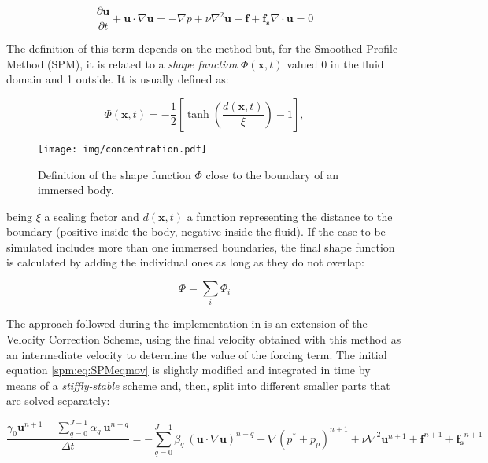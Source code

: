\begin{subequations}
\begin{equation} \label{spm:eq:SPMeqmov}
    \frac{\partial\mathbf{u}}{\partial t} + \mathbf{u}\cdot\nabla\mathbf{u} =
        -\nabla p + \nu\nabla^2\mathbf{u} + \mathbf{f} + \mathbf{f_s}
\end{equation}
\begin{equation}
    \nabla\cdot\mathbf{u} = 0
\end{equation}
\end{subequations}

The definition of this term depends on the method but, for the Smoothed Profile
Method (SPM), it is related to a \emph{shape function} $\Phi(\mathbf{x}, t)$
valued 0 in the fluid domain and 1 outside. It is usually defined as:

\begin{equation} \label{spm:eq:mask}
    \Phi(\mathbf{x},t) = -\frac{1}{2} \left[ \tanh\left(\frac{d(\mathbf{x},t)}
        {\xi}\right)-1 \right],
\end{equation}

\begin{figure}[!htbp]
    \centering
    \texttt{[image: img/concentration.pdf]}
    \caption{Definition of the shape function $\Phi$ close to the boundary of
        an immersed body.}
    \label{spm:fig:shapefunc}
\end{figure}

being $\xi$ a scaling factor \cite{WangSPM} and $d(\mathbf{x}, t)$ a function
representing the distance to the boundary (positive inside the body, negative
inside the fluid). If the case to be simulated includes more than one immersed
boundaries, the final shape function is calculated by adding the individual
ones as long as they do not overlap:

\begin{equation}
    \Phi = \sum_i \Phi_i
\end{equation}

The approach followed during the implementation in \nekpp is an extension of
the Velocity Correction Scheme, using the final velocity obtained with this
method as an intermediate velocity to determine the value of the forcing term.
The initial equation \eqref{spm:eq:SPMeqmov} is slightly modified and
integrated in time by means of a \emph{stiffly-stable} scheme and, then,
split into different smaller parts that are solved separately:

\begin{equation}
     \frac{\gamma_0\mathbf{u}^{n+1}-\sum_{q=0}^{J-1}\alpha_q~\mathbf{u}^{n-q}}
        {\Delta t} = -\sum_{q=0}^{J-1}\beta_q~(\mathbf{u}\cdot
        \nabla\mathbf{u})^{n-q} -\nabla (p^*+p_p)^{n+1} +
        \nu\nabla^2\mathbf{u}^{n+1} + \mathbf{f}^{n+1} + \mathbf{f_s}^{n+1}
\end{equation}

